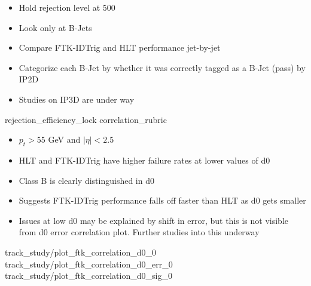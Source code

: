     { \begin{itemize}
        \item Hold rejection level at 500
        \item Look only at B-Jets
        \item Compare FTK-IDTrig and HLT performance jet-by-jet
        \item Categorize each B-Jet by whether it was correctly tagged as a B-Jet (pass) by IP2D
        \item Studies on IP3D are under way
    \end{itemize} }
    {rejection_efficiency_lock}
    {correlation_rubric}

    { \begin{itemize}
        \item $p_t > 55$ GeV and $|\eta| < 2.5$
        \item HLT and FTK-IDTrig have higher failure rates at lower values of d0
        \item Class B is clearly distinguished in d0
        \item Suggests FTK-IDTrig performance falls off faster than HLT as d0 gets smaller
        \item Issues at low d0 may be explained by shift in error,
            but this is not visible from d0 error correlation plot.
            Further studies into this underway
    \end{itemize} }
    {track_study/plot_ftk_correlation_d0_0}
    {track_study/plot_ftk_correlation_d0_err_0}
    {track_study/plot_ftk_correlation_d0_sig_0}
